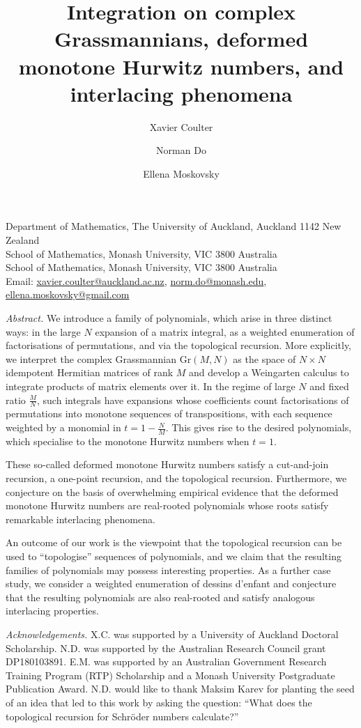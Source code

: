 \documentclass[a4paper]{article}
\title{Integration on complex Grassmannians, deformed monotone Hurwitz numbers, and interlacing phenomena}
\author{Xavier Coulter \and Norman Do \and Ellena Moskovsky}
\theoremstyle{plain}
\numberwithin{theorem}{section}
\theoremstyle{definition}
\theoremstyle{remark}
\begin{document}
\makeatletter
\textbf{\large \thetitle}

\textbf{\theauthor}
\makeatother

Department of Mathematics, The University of Auckland, Auckland 1142 New Zealand \\
School of Mathematics, Monash University, VIC 3800 Australia \\
School of Mathematics, Monash University, VIC 3800 Australia \\
Email: \href{mailto:xavier.coulter@auckland.ac.nz}{xavier.coulter@auckland.ac.nz}, \href{mailto:norm.do@monash.edu}{norm.do@monash.edu}, \href{mailto:ellena.moskovsky@gmail.com}{ellena.moskovsky@gmail.com}


{\em Abstract.} We introduce a family of polynomials, which arise in three distinct ways: in the large $N$ expansion of a matrix integral, as a weighted enumeration of factorisations of permutations, and via the topological recursion. More explicitly, we interpret the complex Grassmannian $\mathrm{Gr}(M,N)$ as the space of $N \times N$ idempotent Hermitian matrices of rank $M$ and develop a Weingarten calculus to integrate products of matrix elements over it. In the regime of large $N$ and fixed ratio $\frac{M}{N}$, such integrals have expansions whose coefficients count factorisations of permutations into monotone sequences of transpositions, with each sequence weighted by a monomial in $t = 1 - \frac{N}{M}$. This gives rise to the desired polynomials, which specialise to the monotone Hurwitz numbers when $t = 1$.


These so-called deformed monotone Hurwitz numbers satisfy a cut-and-join recursion, a one-point recursion, and the topological recursion. Furthermore, we conjecture on the basis of overwhelming empirical evidence that the deformed monotone Hurwitz numbers are real-rooted polynomials whose roots satisfy remarkable interlacing phenomena.


An outcome of our work is the viewpoint that the topological recursion can be used to ``topologise'' sequences of polynomials, and we claim that the resulting families of polynomials may possess interesting properties. As a further case study, we consider a weighted enumeration of dessins d'enfant and conjecture that the resulting polynomials are also real-rooted and satisfy analogous interlacing properties.


\emph{Acknowledgements.} X.C. was supported by a University of Auckland Doctoral Scholarship. N.D. was supported by the Australian Research Council grant DP180103891. E.M. was supported by an Australian Government Research Training Program (RTP) Scholarship and a Monash University Postgraduate Publication Award. N.D. would like to thank Maksim Karev for planting the seed of an idea that led to this work by asking the question: ``What does the topological recursion for Schr\"{o}der numbers calculate?''
\end{document}
